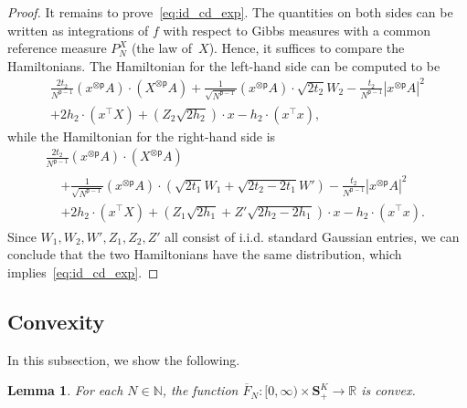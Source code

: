 \documentclass[10pt]{amsart}
\newtheorem{lemm}[theo]{Lemma}\newtheorem{prop}[theo]{Proposition}\newtheorem{coro}[theo]{Corollary}\newtheorem{conj}[theo]{Conjecture}
\theoremstyle{definition}\newtheorem{defi}[theo]{Definition}\newtheorem{rema}[theo]{Remark}\newtheorem{exam}[theo]{Example}\newtheorem{exem}[theo]{Example}\newtheorem{nota}[theo]{Notation}
\newcommand{\N}{\mathbb{N}}
\newcommand{\R}{\mathbb{R}}
\renewcommand{\S}{\mathbf{S}}
\newcommand{\sfp}{\mathsf{p}}
\renewcommand{\bar}{\overline}
\begin{document}
\begin{proof}
It remains to prove~\eqref{eq:id_cd_exp}. The quantities on both sides can be written as integrations of $f$ with respect to Gibbs measures with a common reference measure $P^X_N$ (the law of~$X$). Hence, it suffices to compare the Hamiltonians. The Hamiltonian for the left-hand side can be computed to be
\begin{multline*}
\frac{2t_2}{N^{\sfp-1}}\left(x^{\otimes\sfp}A\right)\cdot \left(X^{\otimes \sfp}A\right)+\frac{1}{\sqrt{N^{\sfp-1}}}\left(x^{\otimes \sfp}A\right)\cdot \sqrt{2t_2} W_2 - \frac{t_2}{N^{\sfp-1}}\left|x^{\otimes \sfp}A\right|^2\\
+ {2}h_2\cdot \left(x^\intercal X\right)+ \left(Z_2\sqrt{2h_2}\right)\cdot x- {h_2\cdot \left(x^\intercal x\right)},
\end{multline*}
while the Hamiltonian for the right-hand side is
\begin{multline*}
\frac{2t_2}{N^{\sfp-1}}\left(x^{\otimes\sfp}A\right)\cdot \left(X^{\otimes \sfp}A\right)\\
\begin{aligned}
&+\frac{1}{\sqrt{N^{\sfp-1}}}\left(x^{\otimes\sfp}A\right)\cdot \left(\sqrt{2t_1}W_1+\sqrt{2t_2-2t_1} W'\right) - \frac{t_2}{N^{\sfp-1}}|x^{\otimes \sfp}A|^2\\
&+ {2}h_2\cdot \left(x^\intercal X\right)+ \left(Z_1\sqrt{2h_1} + Z'\sqrt{2h_2-2h_1}\right)\cdot x- {h_2\cdot \left(x^\intercal x\right)}.
\end{aligned}
\end{multline*}
Since $W_1,W_2,W',Z_1,Z_2,Z'$ all consist of i.i.d. standard Gaussian entries, we can conclude that the two Hamiltonians have the same distribution, which implies~\eqref{eq:id_cd_exp}.
\end{proof}



\subsection{Convexity}

In this subsection, we show the following.

\begin{lemm}\label{l.F_N.conv}
For each $N\in\N$, the function $\bar F_N:[0,\infty)\times \S^K_+\to \R$ is convex.
\end{lemm}
\end{document}
